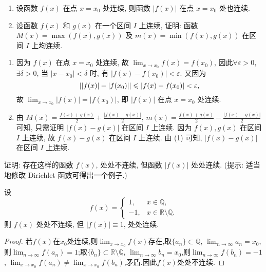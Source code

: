 \begin{exercise}[2.1.4]
    \begin{enumerate}
        \item 设函数 $f(x)$ 在点 $x=x_0$ 处连续, 则函数 $|f(x)|$ 在点 $x=x_0$ 处也连续.
        \item 设函数 $f(x)$ 和 $g(x)$ 在一个区间 $I$ 上连续, 证明: 函数 $M(x)=\max(f(x), g(x))$ 及 $m(x)=\min(f(x), g(x))$ 在区间 $I$ 上均连续.
    \end{enumerate}
\end{exercise}

\begin{solution}
    \begin{enumerate}
        \item 因为 $f(x)$ 在点 $x=x_0$ 处连续, 故 $\lim_{x \to x_0} f(x) = f(x_0)$, 因此$\forall \varepsilon > 0$, $\exists \delta > 0$, 当 $|x-x_0| < \delta$ 时, 有 $|f(x)-f(x_0)| < \varepsilon$. 又因为
              $$ ||f(x)| - |f(x_0)|| \leqslant |f(x)-f(x_0)| < \varepsilon, $$
              故 $\lim_{x \to x_0} |f(x)| = |f(x_0)|$, 即 $|f(x)|$ 在点 $x=x_0$ 处连续.
        \item 由 $M(x) = \frac{f(x)+g(x)}{2} + \frac{|f(x)-g(x)|}{2}$, $m(x) = \frac{f(x)+g(x)}{2} - \frac{|f(x)-g(x)|}{2}$ 可知, 只需证明 $|f(x)-g(x)|$ 在区间 $I$ 上连续. 因为 $f(x), g(x)$ 在区间 $I$ 上连续, 故 $f(x)-g(x)$ 在区间 $I$ 上连续. 由 (1) 可知, $|f(x)-g(x)|$ 在区间 $I$ 上连续.
    \end{enumerate}
\end{solution}

\begin{exercise}[2.1.5]
    证明: 存在这样的函数 $f(x)$, 处处不连续, 但函数 $|f(x)|$ 处处连续. (提示: 适当地修改 Dirichlet 函数可得出一个例子.)
\end{exercise}

\begin{solution}
    设
    $$ f(x) = \begin{cases} 1, & x \in \mathbb{Q}, \\ -1, & x \in \mathbb{R} \setminus \mathbb{Q}. \end{cases} $$
    则 $f(x)$ 处处不连续, 但 $|f(x)| \equiv 1$, 处处连续.
    \begin{proof}
        若$f(x)$在$x_0$处连续,则$\lim_{x \to x_0} f(x)$存在,取$\{a_n\} \subset \mathbb{Q}$, $\lim_{n \to \infty} a_n = x_0$,则$\lim_{n \to \infty} f(a_n) = 1$;取$\{b_n\} \subset \mathbb{R} \setminus \mathbb{Q}$, $\lim_{n \to \infty} b_n = x_0$,则$\lim_{n \to \infty} f(b_n) = -1$, $\lim_{x \to x_0} f(a_n) \ne \lim_{x \to x_0} f(b_n)$,矛盾.因此$f(x)$处处不连续.
    \end{proof}
\end{solution}

